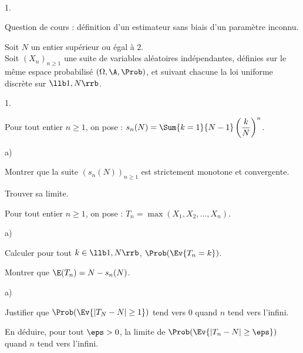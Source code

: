 \begin{exerciceAP}~
  \begin{noliste}{1.}
    \setlength{\itemsep}{2mm}
    \item Question de cours : définition d'un estimateur sans biais
    d'un paramètre inconnu.
  \end{noliste}
  
  \noindent
  Soit $N$ un entier supérieur ou égal à $2$.\\
  Soit $(X_n)_{n\geq 1}$ une suite de variables aléatoires 
  indépendantes, définies sur le même espace probabilisé 
  $(\Omega, \A, \Prob)$, et suivant chacune la loi uniforme discrète
  sur $\llb 1,N \rrb$.
  \begin{noliste}{1.}
    \setlength{\itemsep}{2mm}
    \setcounter{enumi}{1}
    \item Pour tout entier $n\geq 1$, on pose : $s_n(N) = 
    \Sum{k=1}{N-1} \left( \dfrac{k}{N} \right)^n$.
    \begin{noliste}{a)}
    \setlength{\itemsep}{2mm}
      \item Montrer que la suite $(s_n(N))_{n\geq 1}$ est 
      strictement monotone et convergente.
      
      \item Trouver sa limite.
    \end{noliste}
    
    \item Pour tout entier $n\geq 1$, on pose : $T_n = \max(X_1,
    X_2, \ldots, X_n)$.
    \begin{noliste}{a)}
    \setlength{\itemsep}{2mm}
      \item Calculer pour tout $k\in \llb 1,N \rrb$, $\Prob(
      \Ev{T_n=k})$.
      
      \item Montrer que $\E(T_n) = N - s_n(N)$.
    \end{noliste}
    
    \item 
    \begin{noliste}{a)}
    \setlength{\itemsep}{2mm}
      \item Justifier que $\Prob(\Ev{ \vert T_N - N \vert \geq 1})$
      tend vers $0$ quand $n$ tend vers l'infini.
      
      \item En déduire, pour tout $\eps>0$, la limite de 
      $\Prob(\Ev{\vert T_n - N \vert \geq \eps})$ quand $n$ tend 
      vers l'infini.
    \end{noliste}
    

\end{noliste}
\end{exerciceAP}

